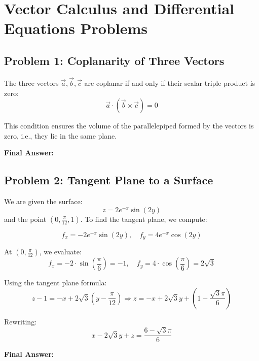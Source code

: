 \documentclass{article}
\begin{document}
\section*{Vector Calculus and Differential Equations Problems}

\subsection*{Problem 1: Coplanarity of Three Vectors}

The three vectors \( \vec{a}, \vec{b}, \vec{c} \) are coplanar if and only if their scalar triple product is zero:
\[
\vec{a} \cdot (\vec{b} \times \vec{c}) = 0
\]

This condition ensures the volume of the parallelepiped formed by the vectors is zero, i.e., they lie in the same plane.

\noindent\textbf{Final Answer: } 

\bigskip

\subsection*{Problem 2: Tangent Plane to a Surface}

We are given the surface:
\[
z = 2e^{-x} \sin(2y)
\]
and the point \( \left(0, \frac{\pi}{12}, 1\right) \). To find the tangent plane, we compute:

\[
f_x = -2e^{-x} \sin(2y), \quad f_y = 4e^{-x} \cos(2y)
\]

At \( (0, \frac{\pi}{12}) \), we evaluate:
\[
f_x = -2 \cdot \sin\left(\frac{\pi}{6}\right) = -1, \quad f_y = 4 \cdot \cos\left(\frac{\pi}{6}\right) = 2\sqrt{3}
\]

Using the tangent plane formula:
\[
z - 1 = -x + 2\sqrt{3} \left(y - \frac{\pi}{12} \right)
\Rightarrow z = -x + 2\sqrt{3}y + \left(1 - \frac{\sqrt{3} \pi}{6} \right)
\]

Rewriting:
\[
x - 2\sqrt{3}y + z = \frac{6 - \sqrt{3}\pi}{6}
\]

\noindent\textbf{Final Answer: } 
\end{document}
